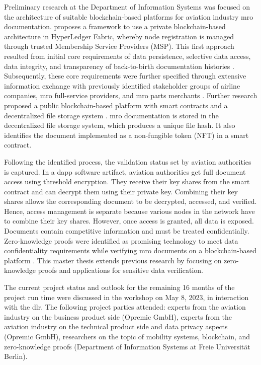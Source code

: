 Preliminary research at the Department of Information Systems was focused on the architecture of suitable blockchain-based platforms for aviation industry \acrshort{mro} documentation. \citet{WickboldtMeiseKliewer} proposes a framework to use a private blockchain-based architecture in HyperLedger Fabric, whereby node registration is managed through trusted Membership Service Providers (MSP). This first approach resulted from initial core requirements of data persistence, selective data access, data integrity, and transparency of back-to-birth documentation histories \citep{WickboldtClemens2018BzdD}. Subsequently, these core requirements were further specified through extensive information exchange with previously identified stakeholder groups of airline companies, \acrshort{mro} full-service providers, and \acrshort{mro} parts merchants \citep{ZedelJ}. Further research proposed a public blockchain-based platform with smart contracts and a decentralized file storage system \citep{ZedelJ}. \acrshort{mro} documentation is stored in the decentralized file storage system, which produces a unique file hash. It also identifies the document implemented as a non-fungible token (NFT) in a smart contract.

Following the identified process, the validation status set by aviation authorities is captured. In a \acrshort{dapp} software artifact, aviation authorities get full document access using threshold encryption. They receive their key shares from the smart contract and can decrypt them using their private key. Combining their key shares allows the corresponding document to be decrypted, accessed, and verified. Hence, access management is separate because various nodes in the network have to combine their key shares. However, once access is granted, all data is exposed. Documents contain competitive information and must be treated confidentially. Zero-knowledge proofs were identified as promising technology to meet data confidentiality requirements while verifying \acrshort{mro} documents on a blockchain-based platform \citep{ZedelJ}. This master thesis extends previous research by focusing on zero-knowledge proofs and applications for sensitive data verification.

The current project status and outlook for the remaining 16 months of the project run time were discussed in the workshop on May 8, 2023, in interaction with the \acrshort{dlr}. The following project parties attended: experts from the aviation industry on the business product side (Opremic GmbH), experts from the aviation industry on the technical product side and data privacy aspects (Opremic GmbH), researchers on the topic of mobility systems, blockchain, and zero-knowledge proofs (Department of Information Systems at Freie Universit{\"a}t Berlin). 

